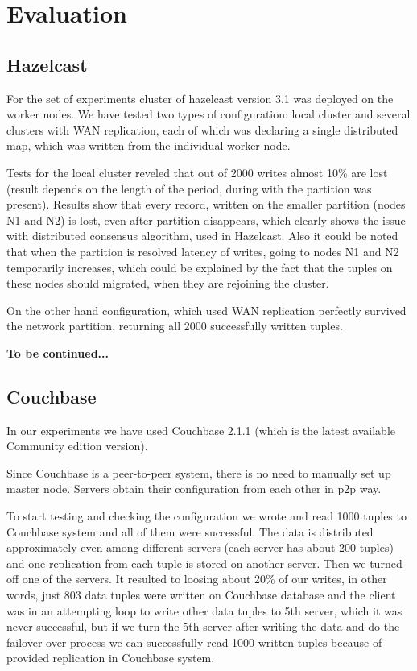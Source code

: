 \documentclass[a4paper]{article}
\begin{document}
\section{Evaluation}

\subsection{Hazelcast}

For the set of experiments cluster of hazelcast version 3.1 was deployed on the worker nodes. 
We have tested two types of configuration: local cluster and several clusters with WAN replication, each of which was declaring a single distributed map, which was written from the individual worker node.

Tests for the local cluster reveled that out of 2000 writes almost 10\% are lost (result depends on the length of the period, during with the partition was present).
Results show that every record, written on the smaller partition (nodes N1 and N2) is lost, even after partition disappears, which clearly shows the issue with distributed consensus algorithm, used in Hazelcast.
Also it could be noted that when the partition is resolved latency of writes, going to nodes N1 and N2 temporarily increases, which could be explained by the fact that the tuples on these nodes should migrated, when they are rejoining the cluster.

On the other hand configuration, which used WAN replication perfectly survived the network partition, returning all 2000 successfully written tuples.

{\bf To be continued...}

\subsection{Couchbase}

In our experiments we have used Couchbase 2.1.1 (which is the latest available Community edition version).

Since Couchbase is a peer-to-peer system, there is no need to manually set up master node. Servers obtain their configuration from each other in p2p way.

To start testing and checking the configuration we wrote and read 1000 tuples to Couchbase system and all of them were successful. 
The data is distributed approximately even among different servers (each server has about 200 tuples) and one replication from each tuple is stored on another server. 
Then we turned off one of the servers. It resulted to loosing about 20\% of our writes, in other words, just 803 data tuples were written on Couchbase database and the client was in an attempting loop to write other data tuples to 5th server, which it was never successful, but if we turn the 5th server after writing the data and do the failover over process we can successfully read 1000 written tuples because of provided replication in Couchbase system.
\end{document}
